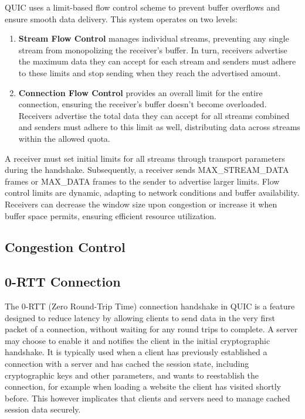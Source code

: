 QUIC uses a limit-based flow control scheme to prevent buffer overflows and ensure smooth data delivery. This system operates on two levels:
\begin{enumerate}
    \item \textbf{Stream Flow Control} manages individual streams, preventing any single stream from monopolizing the receiver's buffer. In turn, receivers advertise the maximum data they can accept for each stream and senders must adhere to these limits and stop sending when they reach the advertised amount.
    \item \textbf{Connection Flow Control} provides an overall limit for the entire connection, ensuring the receiver's buffer doesn't become overloaded. Receivers advertise the total data they can accept for all streams combined and senders must adhere to this limit as well, distributing data across streams within the allowed quota.
\end{enumerate}
A receiver must set initial limits for all streams through transport parameters during the handshake. Subsequently, a receiver sends MAX\_STREAM\_DATA frames or MAX\_DATA frames to the sender to advertise larger limits. Flow control limits are dynamic, adapting to network conditions and buffer availability. Receivers can decrease the window size upon congestion or increase it when buffer space permits, ensuring efficient resource utilization.

\subsection{Congestion Control} \label{congestion_control}


\subsection{0-RTT Connection} \label{zero_rtt}

The 0-RTT (Zero Round-Trip Time) connection handshake in QUIC is a feature designed to reduce latency by allowing clients to send data in the very first packet of a connection, without waiting for any round trips to complete. A server may choose to enable it and notifies the client in the initial cryptographic handshake. It is typically used when a client has previously established a connection with a server and has cached the session state, including cryptographic keys and other parameters, and wants to reestablish the connection, for example when loading a website the client has visited shortly before. This however implicates that clients and servers need to manage cached session data securely.

